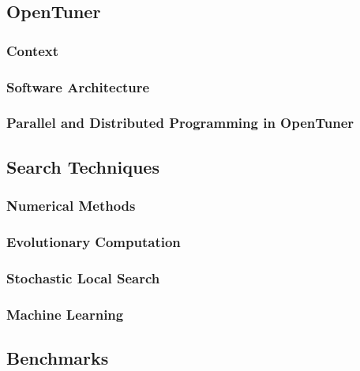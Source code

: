 \subsection{OpenTuner}
\label{sec:opentuner}

\subsubsection{Context}
\label{sec:context}

\subsubsection{Software Architecture}
\label{sec:arch}

\subsubsection{Parallel and Distributed Programming in OpenTuner}
\label{sec:opentuner-parallel}

\subsection{Search Techniques}
\label{sec:techniques}

\subsubsection{Numerical Methods}
\label{subsec:num}

\subsubsection{Evolutionary Computation}
\label{subsec:tuninevolcomp}

\subsubsection{Stochastic Local Search}
\label{subsec:tuningsls}

\subsubsection{Machine Learning}
\label{subsec:tuningml}

\subsection{Benchmarks}
\label{sec:benchmarks}

